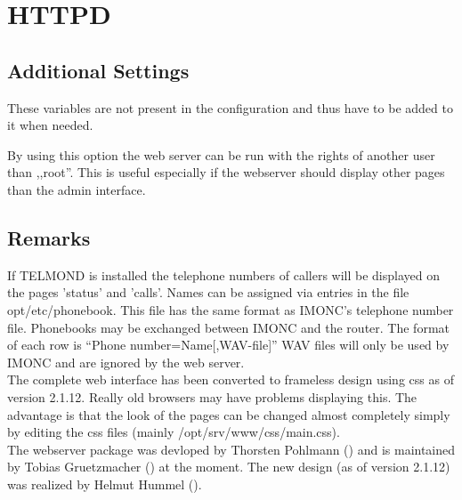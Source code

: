 \section {HTTPD}

\subsection{Additional Settings}

These variables are not present in the configuration and thus have to be 
added to it when needed.

\begin{description}
    {By using this option the web server can be run with the rights of 
    another user than ,,root''. This is useful especially if the webserver 
    should display other pages than the admin interface. 
    }
\end{description}

\subsection{Remarks}

    If TELMOND is installed the telephone numbers of callers will be displayed 
    on the pages 'status' and 'calls'. Names can be assigned via entries in 
    the file opt/etc/phonebook. This file has the same format as IMONC's 
    telephone number file. Phonebooks may be exchanged between IMONC and the 
    router. The format of each row is ``Phone number=Name[,WAV-file]''  
    WAV files will only be used by IMONC and are ignored by the web server.\\

    The complete web interface has been converted to frameless design using css 
    as of version 2.1.12. Really old browsers may have problems displaying this. 
    The advantage is that the look of the pages can be changed almost completely
    simply by editing the css files (mainly /opt/srv/www/css/main.css).\\

    The webserver package was devloped by Thorsten Pohlmann ()
    and is maintained by Tobias Gruetzmacher () at the
    moment. The new design (as of version 2.1.12) was realized by
    Helmut Hummel ().
